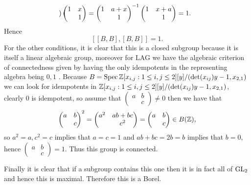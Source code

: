 \begin{example}
\[\begin{pmatrix}
        \end{pmatrix}\begin{pmatrix}
            1 & x \\ & 1
        \end{pmatrix} = \begin{pmatrix}
            1 & a + x \\ & 1
        \end{pmatrix}^{-1} \begin{pmatrix}
            1 & x+a \\ & 1
        \end{pmatrix} = 1.\]
        Hence 
    \[[[B, B], [B, B]] = 1.\]
    For the other conditions, it is clear that this is a closed subgroup because it is itself a linear algebraic group, moreover for LAG we have the algebraic criterion of connectedness given by having the only idempotents in the representing algebra being \(0, 1\) \cite[1.5]{getzIntroductionAutomorphicRepresentations2024}. Because \(B = \Spec \Z[x_{i,j}: 1\leq i,j\leq 2][y] / (\det(x_{ij})y - 1, x_{2,1})\) we can look for idempotents in \(\Z[x_{i,j}: 1\leq i,j\leq 2][y] / (\det(x_{ij})y - 1, x_{2,1})\), clearly \(0\) is idempotent, so assume that \(\begin{pmatrix}
        a & b \\ & c
    \end{pmatrix}\neq 0\) then we have that  
    \[\begin{pmatrix}
        a & b \\ & c
    \end{pmatrix}^2 = \begin{pmatrix}
        a^2 & ab + bc \\ & c^2
    \end{pmatrix} = \begin{pmatrix}
        a & b \\ & c
    \end{pmatrix}\in B(\Z),\]
    so \(a^2 = a, c^2 = c\) implies that \(a = c = 1\) and \(ab + bc = 2b = b\) implies that \(b=0\), hence \(\begin{pmatrix}
        a & b \\ & c
    \end{pmatrix} = 1\). Thus this group is connected. 
    
    Finally it is clear that if a subgroup contains this one then it is in fact all of \(\operatorname{GL}_2\) and hence this is maximal. Therefore this is a Borel.
    \end{example}
        
